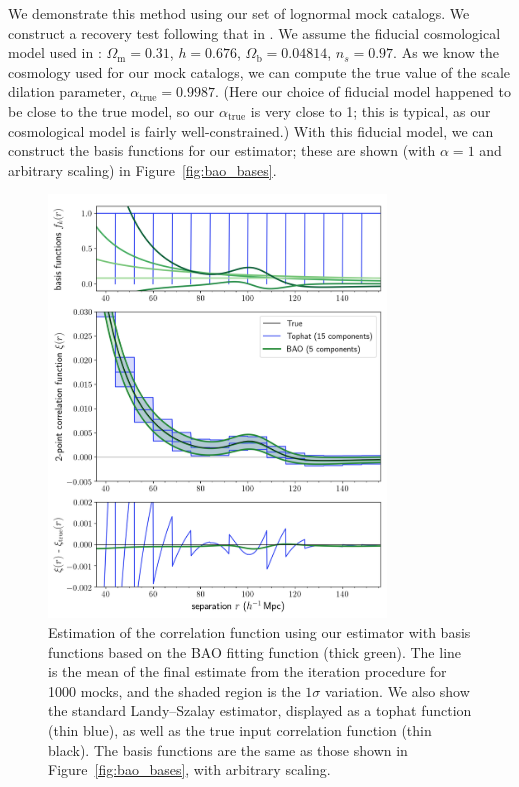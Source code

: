 \documentclass[modern]{aastex62}
\begin{document}
We demonstrate this method using our set of lognormal mock catalogs.
We construct a recovery test following that in \cite{Hinton2019}.
We assume the fiducial cosmological model used in \cite{Beutler2017}: $\Omega_{\text{m}} = 0.31$, $h = 0.676$, $\Omega_{\text{b}} = 0.04814$, $n_s = 0.97$. 
As we know the cosmology used for our mock catalogs, we can compute the true value of the scale dilation parameter, $\alpha_{\text{true}}=0.9987$.
(Here our choice of fiducial model happened to be close to the true model, so our $\alpha_{\text{true}}$ is very close to 1; this is typical, as our cosmological model is fairly well-constrained.)
With this fiducial model, we can construct the basis functions for our estimator; these are shown (with $\alpha=1$ and arbitrary scaling) in Figure~\ref{fig:bao_bases}.

\label{fig:bao}
\begin{figure}[t]
\centering
    \includegraphics[width=0.8\textwidth]{xicomparison_2e-4_tophat8_baoiter}
    \caption{Estimation of the correlation function using our estimator with basis functions based on the BAO fitting function (thick green). The line is the mean of the final estimate from the iteration procedure for 1000 mocks, and the shaded region is the $1\sigma$ variation. We also show the standard Landy--Szalay estimator, displayed as a tophat function (thin blue), as well as the true input correlation function (thin black). The basis functions are the same as those shown in Figure~\ref{fig:bao_bases}, with arbitrary scaling.}
\end{figure}
\end{document}

